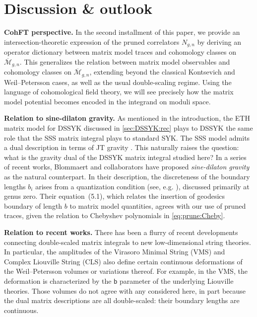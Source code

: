 \documentclass[a4paper,11pt,english]{article}
\theoremstyle{plain}
\theoremstyle{definition}
\theoremstyle{plain}
\newcommand{\Mbar}{\overline{\mathcal{M}}}
\begin{document}
\section{Discussion \& outlook}

\textbf{CohFT perspective.} In the second installment of this paper, we provide an in\-ter\-sec\-tion-theoretic expression of the pruned correlators $N_{g,n}$ by deriving an operator dictionary between matrix model traces and cohomology classes on $\Mbar_{g,n}$. This generalizes the relation between matrix model observables and cohomology classes on $\Mbar_{g,n}$, extending beyond the classical Kontsevich and Weil--Petersson cases, as well as the usual double-scaling regime. Using the language of cohomological field theory, we will see precisely how the matrix model potential becomes encoded in the integrand on moduli space.

\medskip

\textbf{Relation to sine-dilaton gravity.} As mentioned in the introduction, the ETH matrix model for DSSYK discussed in \cref{sec:DSSYK:rec} plays to DSSYK the same role that the SSS matrix integral plays to standard SYK. The SSS model admits a dual description in terms of JT gravity \cite{SSSJTmatrix}. This naturally raises the question: what is the gravity dual of the DSSYK matrix integral studied here? In a series of recent works, Blommaert and collaborators have proposed \emph{sine-dilaton gravity} as the natural counterpart. In their description, the discreteness of the boundary lengths $b_i$ arises from a quantization condition (see, e.g. \cite[equation~(2.16)]{BLMPP25}), discussed primarily at genus zero. Their equation~(5.1), which relates the insertion of geodesics boundary of length $b$ to matrix model quantities, agrees with our use of pruned traces, given the relation to Chebyshev polynomials in \cref{eq:prune:Cheby}.

\medskip

\textbf{Relation to recent works.} There has been a flurry of recent developments connecting double-scaled matrix integrals to new low-dimensional string theories. In particular, the amplitudes of the Virasoro Minimal String (VMS) \cite{CollierVMS,CliffVMS, CliffSuperVMS, RangamaniSuperVMS,IoannisVMS} and Complex Liouville String (CLS) \cite{Collier:CLS,Collier:CLS:world,Collier:CLS:matrix,Collier:CLS:nonper,Collier:path} also define certain continuous deformations of the Weil--Petersson volumes or variations thereof. For example, in the VMS, the deformation is characterized by the $\mathsf{b}$ parameter of the underlying Liouville theories. Those volumes do not agree with any considered here, in part because the dual matrix descriptions are all double-scaled: their boundary lengths are continuous. 
\end{document}
